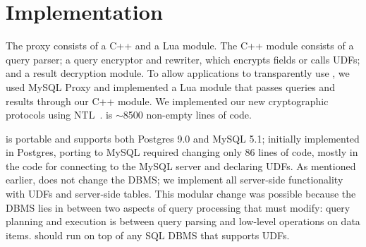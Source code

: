 
\section{Implementation}
\label{s:impl}

The \name{} proxy consists of a C++ and a Lua module.  The C++ module
consists of a query parser; a query encryptor and rewriter, which
encrypts fields or calls UDFs; and a result decryption module.  To
allow applications to transparently use \name, we used MySQL Proxy and
implemented a Lua module that passes queries and results through our
C++ module.  We implemented our new cryptographic protocols using
NTL~\cite{shoup:ntl}.  \name{} is $\sim$8500 non-empty lines of code.

\name is portable and supports both Postgres 9.0 and MySQL 5.1;
initially implemented in Postgres, porting \name{} to MySQL required
changing only 86 lines of code, mostly in the code for connecting to the
MySQL server and declaring UDFs.  As mentioned earlier, \name{} does not
change the DBMS; we implement all server-side functionality with
UDFs and server-side tables.  This modular change was possible because
the DBMS lies in between two aspects of query processing that \name{}
must modify: query planning and execution is between query parsing
and low-level operations on data items.
\name should run on top of any SQL DBMS that supports UDFs.




